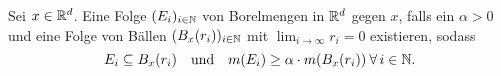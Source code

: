Sei $x\in\mathbb{R}^d$. Eine Folge $(E_i)_{i\in\mathbb{N}}$ von Borelmengen in $\mathbb{R}^d$  gegen $x$, falls ein $\alpha>0$ und eine Folge von Bällen $(B_x(r_i))_{i\in\mathbb{N}}$ mit $\lim_{i\to\infty}r_i=0$ existieren, sodass
\begin{equation*}
    E_i \subseteq B_x(r_i)\quad \text{und}\quad m(E_i)\geq \alpha\cdot m(B_x(r_i)) \:\forall\,i\in\mathbb{N}.
\end{equation*}